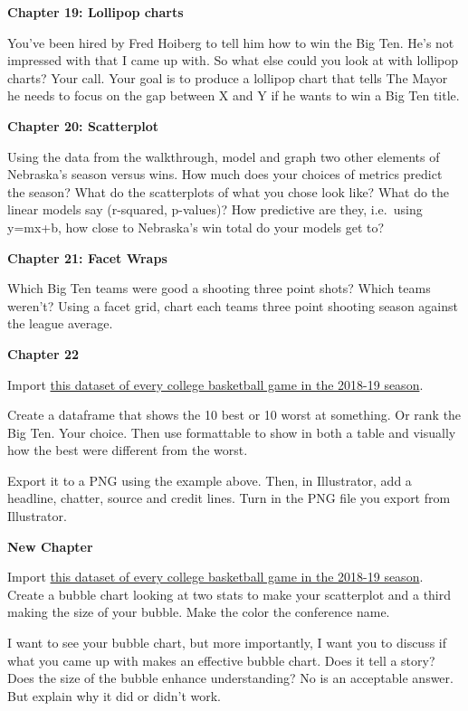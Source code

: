 \documentclass[]{book}
\begin{document}
\textbf{Chapter 19: Lollipop charts}

You've been hired by Fred Hoiberg to tell him how to win the Big Ten. He's not impressed with that I came up with. So what else could you look at with lollipop charts? Your call. Your goal is to produce a lollipop chart that tells The Mayor he needs to focus on the gap between X and Y if he wants to win a Big Ten title.

\textbf{Chapter 20: Scatterplot}

Using the data from the walkthrough, model and graph two other elements of Nebraska's season versus wins. How much does your choices of metrics predict the season? What do the scatterplots of what you chose look like? What do the linear models say (r-squared, p-values)? How predictive are they, i.e.~using y=mx+b, how close to Nebraska's win total do your models get to?

\textbf{Chapter 21: Facet Wraps}

Which Big Ten teams were good a shooting three point shots? Which teams weren't? Using a facet grid, chart each teams three point shooting season against the league average.

\textbf{Chapter 22}

Import \href{https://unl.box.com/s/a8m91bro10t89watsyo13yjegb1fy009}{this dataset of every college basketball game in the 2018-19 season}.

Create a dataframe that shows the 10 best or 10 worst at something. Or rank the Big Ten. Your choice. Then use formattable to show in both a table and visually how the best were different from the worst.

Export it to a PNG using the example above. Then, in Illustrator, add a headline, chatter, source and credit lines. Turn in the PNG file you export from Illustrator.

\textbf{New Chapter}

Import \href{https://unl.box.com/s/a8m91bro10t89watsyo13yjegb1fy009}{this dataset of every college basketball game in the 2018-19 season}. Create a bubble chart looking at two stats to make your scatterplot and a third making the size of your bubble. Make the color the conference name.

I want to see your bubble chart, but more importantly, I want you to discuss if what you came up with makes an effective bubble chart. Does it tell a story? Does the size of the bubble enhance understanding? No is an acceptable answer. But explain why it did or didn't work.
\end{document}
